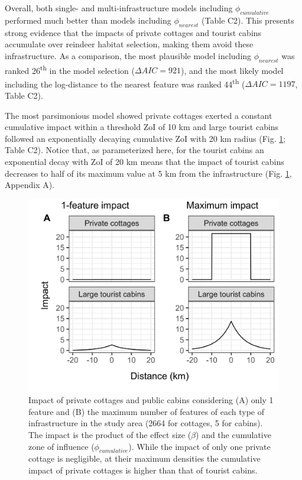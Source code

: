 \documentclass[titlepage]{article}
\begin{document}
Overall, both single- and multi-infrastructure models including $\phi_{cumulative}$ performed much better than models including $\phi_{nearest}$ (Table C2). This presents strong evidence that the impacts of private cottages and tourist cabins accumulate over reindeer habitat selection, making them avoid these infrastructure. As a comparison, the most plausible model including $\phi_{nearest}$ was ranked 26\textsuperscript{th} in the model selection ($\Delta AIC = 921$), and the most likely model including the log-distance to the nearest feature was ranked 44\textsuperscript{th} ($\Delta AIC = 1197$, Table C2).

The most parsimonious model showed private cottages exerted a constant cumulative impact within a threshold ZoI of 10 km and large tourist cabins followed an exponentially decaying cumulative ZoI with 20 km radius (Fig. \ref{fig:impact_plot}; Table C2). Notice that, as parameterized here, for the tourist cabins an exponential decay with ZoI of 20 km means
that the impact of tourist cabins decreases to half of its maximum value
at 5 km from the infrastructure (Fig. \ref{fig:impact_plot}, Appendix A). 

\begin{figure}[h]
\centering
\includegraphics[width=1\textwidth,center]{figures/reindeer_zoi_impact_single_multiple_features.png}
\caption{\label{fig:impact_plot} Impact of private cottages and public cabins considering (A) only 1 feature and (B) the maximum number of features of each type of infrastructure in the study area (2664 for cottages, 5 for cabins). The impact is the product of the effect size ($\beta$) and the cumulative zone of influence ($\phi_{cumulative}$). While the impact of only one private cottage is negligible, at their maximum densities the cumulative impact of private cottages is higher than that of tourist cabins.}
\end{figure}
\end{document}
